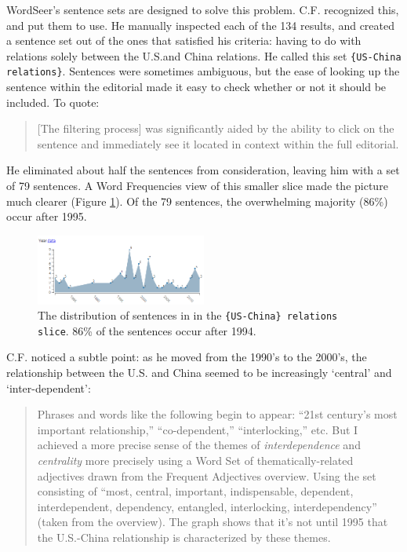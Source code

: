 \documentclass{sig-alternate}
\newcommand{\code}[1] {\texttt{#1}}
\begin{document}
\begin{enumerate}
WordSeer's sentence sets are designed to solve this problem. C.F. recognized this, and put them to use. He manually inspected each of the 134 results, and created a sentence set out of the ones that satisfied his criteria: having to do with relations solely between the U.S.and China relations.  He called this set \code{\{US-China relations\}}. Sentences were sometimes ambiguous, but the ease of looking up the sentence within the editorial made it easy to check whether or not it should be included. To quote:
\begin{quote}
[The filtering process] was significantly aided by the ability to click on the sentence and immediately see it located in context within the full editorial.
\end{quote}
He eliminated about half the sentences from consideration, leaving him with a set of  79 sentences. A Word Frequencies view of this smaller slice made the picture much clearer (Figure \ref{fig:chris06}). Of the 79 sentences, the overwhelming majority (86\%) occur after 1995.
\begin{figure}[h!]
\includegraphics[width=0.5\textwidth]{fig/chris/06.png}
\caption{ The distribution of sentences in in the  \code{\{US-China\} relations slice}.  86\% of the sentences occur after 1994. \label{fig:chris06}}
\end{figure}
C.F. noticed a subtle point: as he moved from the 1990's to the 2000's, the relationship between the U.S. and China seemed to be increasingly  `central' and `inter-dependent':
\begin{quote}
Phrases and words like the following begin to appear: ``21st century's most important relationship,'' ``co-dependent,'' ``interlocking,'' etc. But I achieved a more precise sense of the themes of \emph{interdependence} and \emph{centrality } more precisely using a Word Set of thematically-related adjectives drawn from the Frequent Adjectives overview. Using the set consisting of ``most, central, important, indispensable, dependent, interdependent, dependency, entangled, interlocking, interdependency'' (taken from the overview). The graph shows that it's not until 1995 that the U.S.-China relationship is characterized by these themes.
\end{quote}

\end{enumerate}
\end{document}

